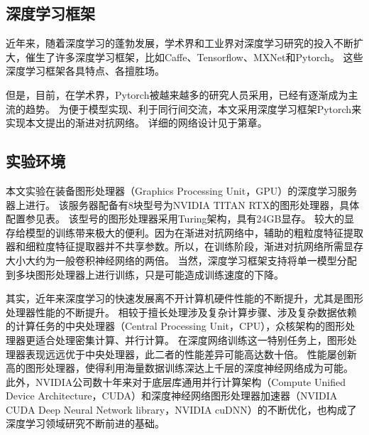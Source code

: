 
\subsection{深度学习框架}
近年来，随着深度学习的蓬勃发展，学术界和工业界对深度学习研究的投入不断扩大，催生了许多深度学习框架，比如Caffe\cite{jia2014caffe}、Tensorflow\cite{abadi2016tensorflow}、MXNet\cite{chen2015mxnet}和Pytorch\cite{paszke2019pytorch}。
这些深度学习框架各具特点、各擅胜场。

但是，目前，在学术界，Pytorch被越来越多的研究人员采用，已经有逐渐成为主流的趋势。
为便于模型实现、利于同行间交流，本文采用深度学习框架Pytorch来实现本文提出的渐进对抗网络。
详细的网络设计见于第章。

\subsection{实验环境}
本文实验在装备图形处理器（Graphics Processing Unit，GPU）的深度学习服务器上进行。
该服务器配备有8块型号为NVIDIA TITAN RTX的图形处理器，具体配置参见表。
该型号的图形处理器采用Turing架构，具有24GB显存。
较大的显存给模型的训练带来极大的便利。因为在渐进对抗网络中，辅助的粗粒度特征提取器和细粒度特征提取器并不共享参数。所以，在训练阶段，渐进对抗网络所需显存大小大约为一般卷积神经网络的两倍。
当然，深度学习框架支持将单一模型分配到多块图形处理器上进行训练，只是可能造成训练速度的下降。

其实，近年来深度学习的快速发展离不开计算机硬件性能的不断提升，尤其是图形处理器性能的不断提升。
相较于擅长处理涉及复杂计算步骤、涉及复杂数据依赖的计算任务的中央处理器（Central Processing Unit，CPU），众核架构的图形处理器更适合处理密集计算、并行计算。
在深度网络训练这一特别任务上，图形处理器表现远远优于中央处理器，此二者的性能差异可能高达数十倍。
性能屡创新高的图形处理器，使得利用海量数据训练深达上千层的深度神经网络成为可能。
此外，NVIDIA公司数十年来对于底层库通用并行计算架构（Compute Unified Device Architecture，CUDA）和深度神经网络图形处理器加速器（NVIDIA CUDA Deep Neural Network library，NVIDIA cuDNN）的不断优化，也构成了深度学习领域研究不断前进的基础。



